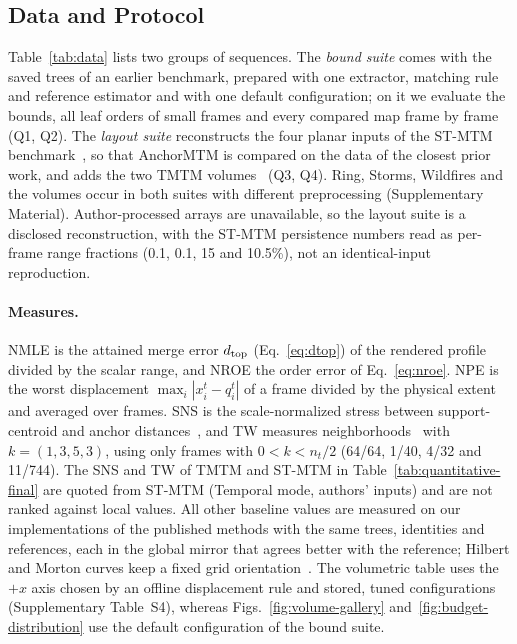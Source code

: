\subsection{Data and Protocol}\label{sec:data}

Table~\ref{tab:data} lists two groups of sequences. The \emph{bound suite} comes with the saved trees of an earlier benchmark, prepared with one extractor, matching rule and reference estimator and with one default configuration; on it we evaluate the bounds, all leaf orders of small frames and every compared map frame by frame (Q1, Q2). The \emph{layout suite} reconstructs the four planar inputs of the ST-MTM benchmark~\cite{STMTM:2026}, so that AnchorMTM is compared on the data of the closest prior work, and adds the two TMTM volumes~\cite{Koepp:2023:TMTM,Weinkauf:SquareCylinder} (Q3, Q4). Ring, Storms, Wildfires and the volumes occur in both suites with different preprocessing (Supplementary Material). Author-processed arrays are unavailable, so the layout suite is a disclosed reconstruction, with the ST-MTM persistence numbers read as per-frame range fractions (0.1, 0.1, 15 and 10.5\%), not an identical-input reproduction.

\paragraph{Measures.} NMLE is the attained merge error $d_{\mathrm{top}}$ (Eq.~\ref{eq:dtop}) of the rendered profile divided by the scalar range, and NROE the order error of Eq.~\ref{eq:nroe}. NPE is the worst displacement $\max_i|x_i^t-q_i^t|$ of a frame divided by the physical extent and averaged over frames. SNS is the scale-normalized stress between support-centroid and anchor distances~\cite{Smelser:2025:Scale,STMTM:2026}, and TW measures neighborhoods~\cite{Venna:2001:NP} with $k=(1,3,5,3)$, using only frames with $0<k<n_t/2$ (64/64, 1/40, 4/32 and 11/744). The SNS and TW of TMTM and ST-MTM in Table~\ref{tab:quantitative-final} are quoted from ST-MTM (Temporal mode, authors' inputs) and are not ranked against local values. All other baseline values are measured on our implementations of the published methods with the same trees, identities and references, each in the global mirror that agrees better with the reference; Hilbert and Morton curves keep a fixed grid orientation~\cite{Franke:2021:1DP}. The volumetric table uses the $+x$ axis chosen by an offline displacement rule and stored, tuned configurations (Supplementary Table~S4), whereas Figs.~\ref{fig:volume-gallery} and~\ref{fig:budget-distribution} use the default configuration of the bound suite.

